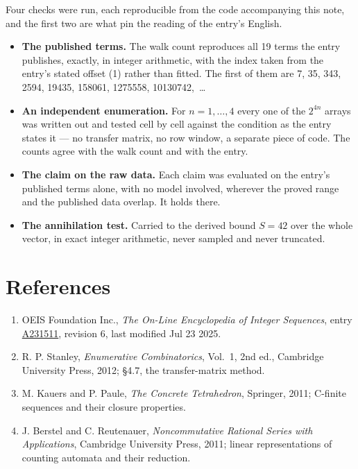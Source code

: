 \documentclass[11pt]{article}
\theoremstyle{definition}
\begin{document}
Four checks were run, each reproducible from the code accompanying this note, and the first two are what pin the reading of the entry's English.

\begin{itemize}

\item {\bfseries The published terms.} The walk count reproduces all 19 terms the entry publishes, exactly, in integer arithmetic, with the index taken from the entry's stated offset (1) rather than fitted. The first of them are 7, 35, 343, 2594, 19435, 158061, 1275558, 10130742,~\dots

\item {\bfseries An independent enumeration.} For $n = 1,\dots,4$ every one of the $2^{4n}$ arrays was written out and tested cell by cell against the condition as the entry states it --- no transfer matrix, no row window, a separate piece of code. The counts agree with the walk count and with the entry.

\item {\bfseries The claim on the raw data.} Each claim was evaluated on the entry's published terms alone, with no model involved, wherever the proved range and the published data overlap. It holds there.

\item {\bfseries The annihilation test.} Carried to the derived bound $S = 42$ over the whole vector, in exact integer arithmetic, never sampled and never truncated.

\end{itemize}

\section{References}

\begin{enumerate}

\item OEIS Foundation Inc., \emph{The On-Line Encyclopedia of Integer Sequences}, entry \href{https://oeis.org/A231511}{A231511}, revision 6, last modified Jul 23 2025.

\item R. P. Stanley, \emph{Enumerative Combinatorics}, Vol.~1, 2nd ed., Cambridge University Press, 2012; \S4.7, the transfer-matrix method.

\item M. Kauers and P. Paule, \emph{The Concrete Tetrahedron}, Springer, 2011; C-finite sequences and their closure properties.

\item J. Berstel and C. Reutenauer, \emph{Noncommutative Rational Series with Applications}, Cambridge University Press, 2011; linear representations of counting automata and their reduction.

\end{enumerate}
\end{document}
